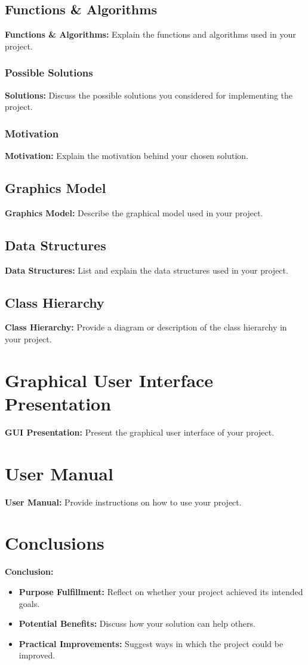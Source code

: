 \documentclass[12pt]{article}
\begin{document}
	\subsection{Functions \& Algorithms}
	\textbf{Functions \& Algorithms:} Explain the functions and algorithms used in your project.
	
	\subsubsection{Possible Solutions}
	\textbf{Solutions:} Discuss the possible solutions you considered for implementing the project.
	
	\subsubsection{Motivation}
	\textbf{Motivation:} Explain the motivation behind your chosen solution.
	
	\subsection{Graphics Model}
	\textbf{Graphics Model:} Describe the graphical model used in your project.
	
	\subsection{Data Structures}
	\textbf{Data Structures:} List and explain the data structures used in your project.
	
	\subsection{Class Hierarchy}
	\textbf{Class Hierarchy:} Provide a diagram or description of the class hierarchy in your project.
	
	\section{Graphical User Interface Presentation}
	\textbf{GUI Presentation:} Present the graphical user interface of your project.
	
	\section{User Manual}
	\textbf{User Manual:} Provide instructions on how to use your project.
	
	\section{Conclusions}
	\textbf{Conclusion:}
	\begin{itemize}
		\item \textbf{Purpose Fulfillment:} Reflect on whether your project achieved its intended goals.
		\item \textbf{Potential Benefits:} Discuss how your solution can help others.
		\item \textbf{Practical Improvements:} Suggest ways in which the project could be improved.
	\end{itemize}
	
\end{document}
